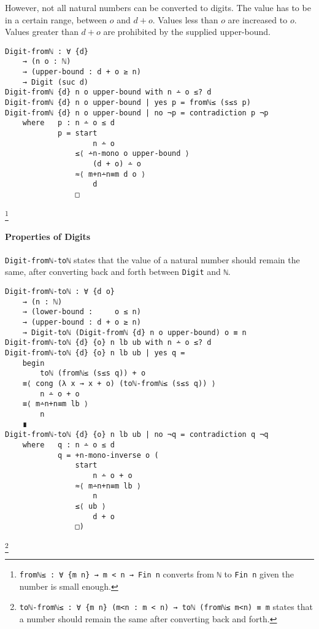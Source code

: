 \documentclass[../thesis.tex]{subfiles}
\begin{document}
However, not all natural numbers can be converted to digits.
The value has to be in a certain range, between $ o $ and $ d + o $.
Values less than $ o $ are increased to $ o $.
Values greater than $ d + o $ are prohibited by the supplied upper-bound.

\begin{lstlisting}
Digit-fromℕ : ∀ {d}
    → (n o : ℕ)
    → (upper-bound : d + o ≥ n)
    → Digit (suc d)
Digit-fromℕ {d} n o upper-bound with n ∸ o ≤? d
Digit-fromℕ {d} n o upper-bound | yes p = fromℕ≤ (s≤s p)
Digit-fromℕ {d} n o upper-bound | no ¬p = contradiction p ¬p
    where   p : n ∸ o ≤ d
            p = start
                    n ∸ o
                ≤⟨ ∸n-mono o upper-bound ⟩
                    (d + o) ∸ o
                ≈⟨ m+n∸n≡m d o ⟩
                    d
                □
\end{lstlisting}
\footnote{
    {\lstinline|fromℕ≤ : ∀ {m n} → m < n → Fin n|}
    \newline\hspace*{4em} converts from {\lstinline|ℕ|} to {\lstinline|Fin n|} given the number is small enough.
}



\paragraph{Properties of Digits}
{\lstinline|Digit-fromℕ-toℕ|} states that the value of a natural number should
remain the same, after converting back and forth between {\lstinline|Digit|} and
{\lstinline|ℕ|}.

\begin{lstlisting}
Digit-fromℕ-toℕ : ∀ {d o}
    → (n : ℕ)
    → (lower-bound :     o ≤ n)
    → (upper-bound : d + o ≥ n)
    → Digit-toℕ (Digit-fromℕ {d} n o upper-bound) o ≡ n
Digit-fromℕ-toℕ {d} {o} n lb ub with n ∸ o ≤? d
Digit-fromℕ-toℕ {d} {o} n lb ub | yes q =
    begin
        toℕ (fromℕ≤ (s≤s q)) + o
    ≡⟨ cong (λ x → x + o) (toℕ-fromℕ≤ (s≤s q)) ⟩
        n ∸ o + o
    ≡⟨ m∸n+n≡m lb ⟩
        n
    ∎
Digit-fromℕ-toℕ {d} {o} n lb ub | no ¬q = contradiction q ¬q
    where   q : n ∸ o ≤ d
            q = +n-mono-inverse o (
                start
                    n ∸ o + o
                ≈⟨ m∸n+n≡m lb ⟩
                    n
                ≤⟨ ub ⟩
                    d + o
                □)
\end{lstlisting}
\footnote{
    {\lstinline|toℕ-fromℕ≤ : ∀ {m n} (m<n : m < n) → toℕ (fromℕ≤ m<n) ≡ m|}
    \newline\hspace*{4em} states that a number should remain the same after converting back and forth.
}
\end{document}
